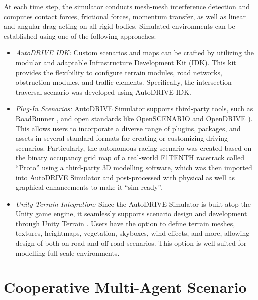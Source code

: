 \documentclass[letterpaper, 10 pt, conference]{ieeeconf}  %
\begin{document}
At each time step, the simulator conducts mesh-mesh interference detection and computes contact forces, frictional forces, momentum transfer, as well as linear and angular drag acting on all rigid bodies. Simulated environments can be established using one of the following approaches:
\begin{itemize}
     \item \textit{AutoDRIVE IDK:} Custom scenarios and maps can be crafted by utilizing the modular and adaptable Infrastructure Development Kit (IDK). This kit provides the flexibility to configure terrain modules, road networks, obstruction modules, and traffic elements. Specifically, the intersection traversal scenario was developed using AutoDRIVE IDK.

     \item \textit{Plug-In Scenarios:} AutoDRIVE Simulator supports third-party tools, such as RoadRunner \cite{RoadRunner2021}, and open standards like OpenSCENARIO \cite{OpenSCENARIO2021} and OpenDRIVE \cite{OpenDRIVE2021}). This allows users to incorporate a diverse range of plugins, packages, and assets in several standard formats for creating or customizing driving scenarios. Particularly, the autonomous racing scenario was created based on the binary occupancy grid map of a real-world F1TENTH racetrack called ``Proto'' using a third-party 3D modelling software, which was then imported into AutoDRIVE Simulator and post-processed with physical as well as graphical enhancements to make it ``sim-ready''.

     \item \textit{Unity Terrain Integration:} Since the AutoDRIVE Simulator is built atop the Unity \cite{Unity2021} game engine, it seamlessly supports scenario design and development through Unity Terrain \cite{UnityTerrain2021}. Users have the option to define terrain meshes, textures, heightmaps, vegetation, skyboxes, wind effects, and more, allowing design of both on-road and off-road scenarios. This option is well-suited for modelling full-scale environments.
\end{itemize}


\section{Cooperative Multi-Agent Scenario}
\label{Section: Cooperative Multi-Agent Scenario}
\end{document}
